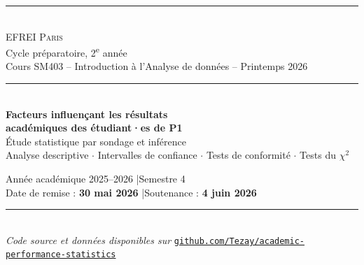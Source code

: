 \documentclass[a4paper, 10pt]{article}
\begin{document}
\begin{titlepage}
\centering

\rule{\linewidth}{0.6mm}\\[0.5cm]

{\large \textsc{EFREI Paris}\\[0.15cm]
\normalsize Cycle préparatoire, 2\textsuperscript{e} année\\[0.05cm]
Cours SM403 – Introduction à l'Analyse de données – Printemps 2026}\\[0.4cm]

\rule{\linewidth}{0.2mm}\\[1.8cm]

{\Huge \bfseries Facteurs influençant les résultats\\[0.3cm]
académiques des étudiant·es de P1}\\[0.8cm]

{\Large Étude statistique par sondage et inférence}\\[0.4cm]
{\normalsize Analyse descriptive $\cdot$ Intervalles de confiance $\cdot$ Tests de conformité $\cdot$ Tests du $\chi^2$}

\vfill


\vfill

{\normalsize
Année académique 2025–2026 \quad|\quad Semestre 4\\[0.4cm]
Date de remise : \textbf{30 mai 2026} \quad|\quad Soutenance : \textbf{4 juin 2026}
}\\[0.8cm]

\rule{\linewidth}{0.6mm}\\[0.3cm]
{\small \textit{Code source et données disponibles sur }
\href{https://github.com/Tezay/academic-performance-statistics}{\texttt{github.com/Tezay/academic-performance-statistics}}}

\end{titlepage}







\appendix
% 
% 
\end{document}
